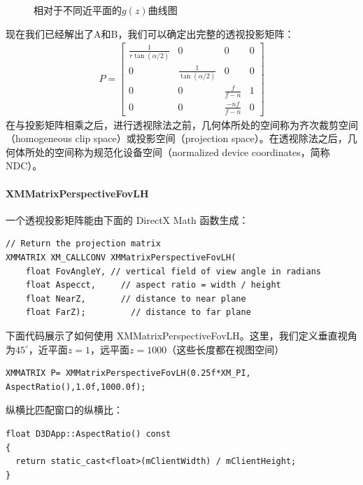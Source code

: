\documentclass[11pt,a4paper,oldfontcommands]{memoir}
\begin{document}
{\begin{figure}[b]
    \centering
    \caption{相对于不同近平面的$g(z)$曲线图}
    \label{fig:5-25}
\end{figure}
\begin{flushleft}
现在我们已经解出了A和B，我们可以确定出完整的透视投影矩阵：
\begin{align*}
P=\begin{bmatrix}
\frac{1}{r\tan(\alpha/2)} & 0 & 0 & 0\\
0 & \frac{1}{\tan(\alpha/2)} & 0 & 0\\
0 & 0 & \frac{f}{f-n} & 1\\
0 & 0 & \frac{-nf}{f-n} & 0
\end{bmatrix}
\end{align*}
在与投影矩阵相乘之后，进行透视除法之前，几何体所处的空间称为齐次裁剪空间（homogeneous clip space）或投影空间（projection space）。在透视除法之后，几何体所处的空间称为规范化设备空间（normalized device coordinates，简称NDC）。
\end{flushleft}

\paragraph{XMMatrixPerspectiveFovLH}
\begin{flushleft}
一个透视投影矩阵能由下面的 DirectX Math 函数生成：
\begin{lstlisting}
// Return the projection matrix
XMMATRIX XM_CALLCONV XMMatrixPerspectiveFovLH(
    float FovAngleY, // vertical field of view angle in radians
    float Aspecct,     // aspect ratio = width / height
    float NearZ,       // distance to near plane
    float FarZ);         // distance to far plane
\end{lstlisting}
下面代码展示了如何使用 XMMatrixPerspectiveFovLH。这里，我们定义垂直视角为$45^{\circ}$，近平面$z=1$，远平面$z=1000$（这些长度都在视图空间）
\begin{lstlisting}
XMMATRIX P= XMMatrixPerspectiveFovLH(0.25f*XM_PI, AspectRatio(),1.0f,1000.0f);
\end{lstlisting}
纵横比匹配窗口的纵横比：
\begin{lstlisting}
float D3DApp::AspectRatio() const
{
  return static_cast<float>(mClientWidth) / mClientHeight;
}
\end{lstlisting}
\end{flushleft}

}
\end{document}
